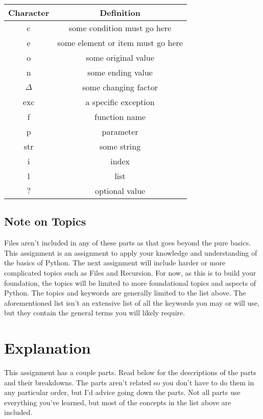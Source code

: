 \documentclass[12pt]{report}
\begin{document}
\begin{tabular}{| c | c |}
    \hline
    Character & Definition \\
    \hline
    c & some condition must go here \\
    \hline
    e & some element or item must go here \\
    \hline
    o & some original value \\
    \hline
    n & some ending value \\
    \hline
    ${\Delta}$ & some changing factor \\ 
    \hline
    exc & a specific exception \\
    \hline
    f & function name \\
    \hline
    p & parameter \\
    \hline
    str & some string \\
    \hline
    i & index \\
    \hline
    l & list \\
    \hline
    ${?}$ & optional value \\
    \hline
\end{tabular}

\subsection*{Note on Topics}
Files aren't included in any of these parts as that goes beyond the pure basics. 
This assignment is an assignment to apply your knowledge and understanding of the basics of Python. 
The next assignment will include harder or more complicated topics such as Files and Recursion.
For now, as this is to build your foundation, the topics will be limited to more foundational topics and aspects of Python.
The topics and keywords are generally limited to the list above. 
The aforementioned list isn't an extensive list of all the keywords you may or will use, but they contain the general terms you will likely require.

\newpage

\section*{Explanation}

\hspace*{0.5cm} This assignment has a couple parts. 
Read below for the descriptions of the parts and their breakdowns. 
The parts aren't related so you don't have to do them in any particular order, but I'd advice going down the parts. 
Not all parts use everything you've learned, but most of the concepts in the list above are included.
\end{document}
